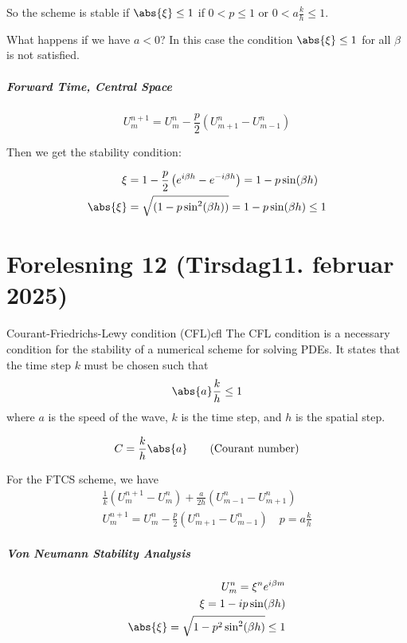 So the scheme is stable if \(\abs{\xi} \leq 1 \) if \(0 < p \leq 1\) or \(0 < a \frac{k}{h} \leq 1\).

What happens if we have \(a < 0\)? In this case the condition \(\abs{\xi} \leq 1 \) for all \( \beta \) is not satisfied.

\subparagraph{Forward Time, Central Space}

\[
  U_m^{n+1} = U_m^n - \frac{p}{2}\left( U_{m+1}^n - U_{m-1}^n \right)
\]

Then we get the stability condition:

\begin{align*}
  \xi       & = 1 - \frac{p}{2}\left( e^{i\beta h} - e^{-i\beta h} \right) = 1 - p\sin(\beta h) \\
  \abs{\xi} & = \sqrt{(1 - p\sin^2(\beta h))} = 1 - p\sin(\beta h) \leq 1
\end{align*}

\clearpage
\section{Forelesning 12 (Tirsdag11. februar 2025)}

\begin{definition}{Courant-Friedrichs-Lewy condition (CFL)}{cfl}
  The CFL condition is a necessary condition for the stability of a numerical scheme for solving PDEs.
  It states that the time step \(k\) must be chosen such that
  \[
    \abs{a} \frac{k}{h} \leq 1
  \]
  where \(a\) is the speed of the wave, \(k\) is the time step, and \(h\) is the spatial step.

  \[
    C = \frac{k}{h} \abs{a} \tag {Courant number}
  \]

\end{definition}

For the FTCS scheme, we have
\begin{align*}
  \frac{1}{k}\left( U_m^{n+1} - U_m^n \right) + \frac{a}{2h}\left( U_{m-1}^n - U_{m+1}^n \right) \\
  U_m^{n+1} = U_m^n - \frac{p}{2}\left( U_{m+1}^n - U_{m-1}^n \right) \quad p = a \frac{k}{h}
\end{align*}

\subparagraph{Von Neumann Stability Analysis}
\begin{align*}
  U_m^n = \xi^n e^{i\beta m} \\
  \xi = 1 - ip\sin(\beta h)  \\
  \abs{\xi} = \sqrt{1 - p^2\sin^2(\beta h)} \leq 1
\end{align*}

